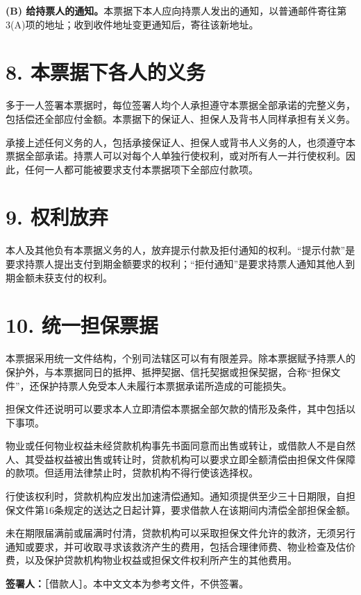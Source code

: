 \documentclass[UTF8,fontset=none,11pt,a4paper]{ctexart}
\begin{document}
\textbf{(B) 给持票人的通知。}本票据下本人应向持票人发出的通知，以普通邮件寄往第3(A)项的地址；收到收件地址变更通知后，寄往该新地址。


\section*{8. 本票据下各人的义务}
多于一人签署本票据时，每位签署人均个人承担遵守本票据全部承诺的完整义务，包括偿还全部应付金额。本票据下的保证人、担保人及背书人同样承担有关义务。


承接上述任何义务的人，包括承接保证人、担保人或背书人义务的人，也须遵守本票据全部承诺。持票人可以对每个人单独行使权利，或对所有人一并行使权利。因此，任何一人都可能被要求支付本票据项下全部应付款项。


\section*{9. 权利放弃}
本人及其他负有本票据义务的人，放弃提示付款及拒付通知的权利。“提示付款”是要求持票人提出支付到期金额要求的权利；“拒付通知”是要求持票人通知其他人到期金额未获支付的权利。


\section*{10. 统一担保票据}
本票据采用统一文件结构，个别司法辖区可以有有限差异。除本票据赋予持票人的保护外，与本票据同日的抵押、抵押契据、信托契据或担保契据，合称“担保文件”，还保护持票人免受本人未履行本票据承诺所造成的可能损失。


担保文件还说明可以要求本人立即清偿本票据全部欠款的情形及条件，其中包括以下事项。


物业或任何物业权益未经贷款机构事先书面同意而出售或转让，或借款人不是自然人、其受益权益被出售或转让时，贷款机构可以要求立即全额清偿由担保文件保障的款项。但适用法律禁止时，贷款机构不得行使该选择权。


行使该权利时，贷款机构应发出加速清偿通知。通知须提供至少三十日期限，自担保文件第16条规定的送达之日起计算，要求借款人在该期间内清偿全部担保金额。


未在期限届满前或届满时付清，贷款机构可以采取担保文件允许的救济，无须另行通知或要求，并可收取寻求该救济产生的费用，包括合理律师费、物业检查及估价费，以及保护贷款机构物业权益或担保文件权利所产生的其他费用。


\textbf{签署人：}［借款人］。本中文文本为参考文件，不供签署。
\end{document}
